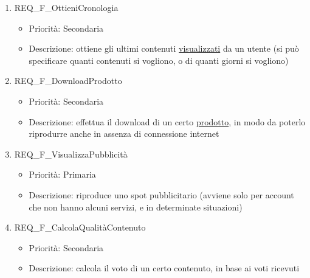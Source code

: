 \begin{enumerate}
	\item REQ\_F\_OttieniCronologia
		\begin{itemize}	
		\item Priorità: Secondaria
		\item Descrizione: ottiene gli ultimi contenuti \hyperlink{AnReqVisual}{visualizzati} da un utente (si può specificare quanti contenuti si vogliono, o di quanti giorni si vogliono)
		\end{itemize}

	\item REQ\_F\_DownloadProdotto
		\begin{itemize}	
		\item Priorità: Secondaria
		\item Descrizione: effettua il download di un certo \hyperlink{AnReqProdMult}{prodotto}, in modo da poterlo riprodurre anche in assenza di connessione internet
		\end{itemize}
	
	\item REQ\_F\_VisualizzaPubblicità
		\begin{itemize}
		\item Priorità: Primaria
		\item Descrizione: riproduce uno spot pubblicitario (avviene solo per account che non hanno alcuni servizi, e in determinate situazioni)
		\end{itemize}
	
		
	\item REQ\_F\_CalcolaQualitàContenuto
		\begin{itemize}	
		\item Priorità: Secondaria
		\item Descrizione: calcola il voto di un certo contenuto, in base ai voti ricevuti
		\end{itemize}
	

\end{enumerate}
